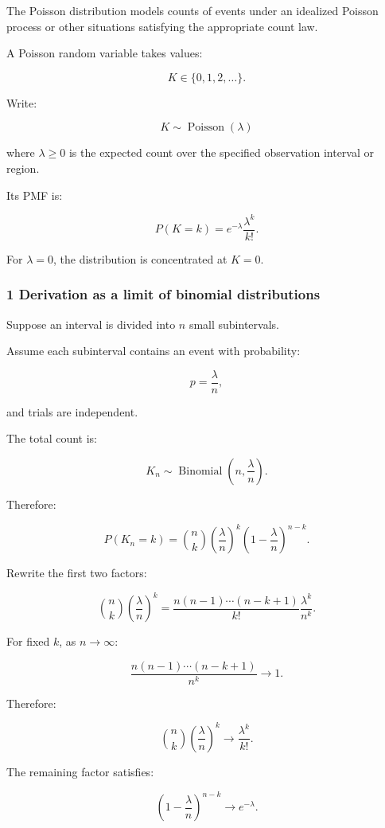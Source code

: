 The Poisson distribution models counts of events under an idealized Poisson process or other situations satisfying the appropriate count law.

A Poisson random variable takes values:

\[
 K\in\{0,1,2,\ldots\}.
\]

Write:

\[
 \boxed{K\sim\operatorname{Poisson}(\lambda)}
\]

where \(\lambda\ge0\) is the expected count over the specified observation interval or region.

Its PMF is:

\[
 \boxed{ P(K=k)= e^{-\lambda}\frac{\lambda^k}{k!} }.
\]

For \(\lambda=0\), the distribution is concentrated at \(K=0\).

\subsubsection{1 Derivation as a limit of binomial distributions}\label{02-foundations-ii-ch024-derivation-as-a-limit-of-binomial-distributions}

Suppose an interval is divided into \(n\) small subintervals.

Assume each subinterval contains an event with probability:

\[
 p=\frac\lambda n,
\]

and trials are independent.

The total count is:

\[
 K_n\sim\operatorname{Binomial} \left(n,\frac\lambda n\right).
\]

Therefore:

\[
 P(K_n=k) = \binom nk \left(\frac\lambda n\right)^k \left(1-\frac\lambda n\right)^{n-k}.
\]

Rewrite the first two factors:

\[
 \binom nk\left(\frac\lambda n\right)^k = \frac{n(n-1)\cdots(n-k+1)}{k!} \frac{\lambda^k}{n^k}.
\]

For fixed \(k\), as \(n\to\infty\):

\[
 \frac{n(n-1)\cdots(n-k+1)}{n^k} \to1.
\]

Therefore:

\[
 \binom nk\left(\frac\lambda n\right)^k \to \frac{\lambda^k}{k!}.
\]

The remaining factor satisfies:

\[
 \left(1-\frac\lambda n\right)^{n-k} \to e^{-\lambda}.
\]

